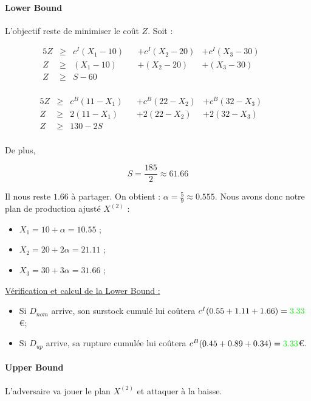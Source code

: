 \documentclass[11pt,a4paper]{article}
\begin{document}
\paragraph{Lower Bound} L'objectif reste de minimiser le coût $Z$. Soit :
    
\begin{alignat}{5}
   Z& \geq{}&  c^I(X_1-10)&& + c^I(X_2-20)& + c^I(X_3-30)&&\\
   Z& \geq{}& (X_1-10)&& + (X_2-20)& + (X_3-30)&&\\
   Z& \geq{}& S-60&&\\
\end{alignat}
    
\begin{alignat}{5}
   Z& \geq{}&  c^B(11-X_1)&& + c^B(22-X_2)& + c^B(32-X_3)&&\\
   Z& \geq{}& 2(11-X_1)&& + 2(22-X_2)& + 2(32-X_3)&&\\
   Z& \geq{}& 130-2S&&\\
\end{alignat}

De plus, 

\[
    S = \frac{185}{2}\approx 61.66
\]

Il nous reste $1.66$ à partager. On obtient : $\alpha=\frac{5}{9}\approx0.555$. Nous avons donc notre plan de production ajusté $X^{(2)}$ :

\begin{itemize}
    \item $X_1 = 10 + \alpha = 10.55$ ;
    \item $X_2 = 20 + 2\alpha = 21.11$ ;
    \item $X_3 = 30 + 3\alpha = 31.66$ ;
\end{itemize}

\underline{Vérification et calcul de la Lower Bound :}

\begin{itemize}
    \item Si $D_{nom}$ arrive, son surstock cumulé lui coûtera $c^I(0.55+1.11+1.66)=\textcolor{green}{3.33}$\euro ;
    \item  Si $D_{up}$ arrive, sa rupture cumulée lui coûtera $c^B(0.45+0.89+0.34)=\textcolor{green}{3.33}$\euro.
\end{itemize}

\paragraph{Upper Bound} L'adversaire va jouer le plan $X^{(2)}$ et attaquer à la baisse.
\end{document}
